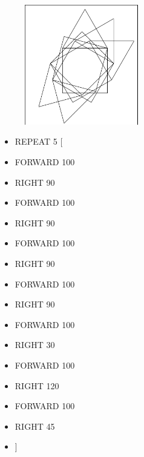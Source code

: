 \begin{minipage}{0.5\textwidth}
\begin{figure}[H]
	\includegraphics[width=5.0cm,trim=4 4 6 4,clip]{./images/marta/mar-4.png}
   \label{mar-4}
\end{figure}
\end{minipage} \hfill
\begin{minipage}{0.45\textwidth}
\begin{itemize}[itemsep=-3pt,parsep=2pt]
\item[] \hspace{0.5cm} REPEAT 5 [
\item[] \hspace{0.5cm} 	FORWARD 100
\item[] \hspace{0.5cm} 	RIGHT 90
\item[] \hspace{0.5cm} 	FORWARD 100
\item[] \hspace{0.5cm} 	RIGHT 90
\item[] \hspace{0.5cm} 	FORWARD 100
\item[] \hspace{0.5cm} 	RIGHT 90
\item[] \hspace{0.5cm} 	FORWARD 100
\item[] \hspace{0.5cm} 	RIGHT 90
\item[] \hspace{0.5cm} 	FORWARD 100
\item[] \hspace{0.5cm} 	RIGHT 30
\item[] \hspace{0.5cm} 	FORWARD 100
\item[] \hspace{0.5cm} 	RIGHT 120
\item[] \hspace{0.5cm} 	FORWARD 100
\item[] \hspace{0.5cm} 	RIGHT 45
\item[] \hspace{0.5cm} 	]          
\end{itemize}
\end{minipage}

